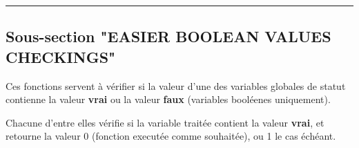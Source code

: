 \documentclass[a4paper,10pt]{article}
\begin{document}



    \color{sec2}\par\noindent\rule{\textwidth}{0.4pt}\color{text}

    \color{sec2}
    \subsection{Sous-section "EASIER BOOLEAN VALUES CHECKINGS"}\color{text}

    \begin{justify}
        Ces fonctions servent à vérifier si la valeur d'une des variables globales de statut contienne la valeur \textbf{vrai} ou la valeur \textbf{faux} (variables booléenes uniquement).
    \end{justify}

    \begin{justify}
        Chacune d'entre elles vérifie si la variable traitée contient la valeur \textbf{vrai}, et retourne la valeur 0 (fonction executée comme souhaitée), ou 1 le cas échéant.
    \end{justify}
\end{document}
